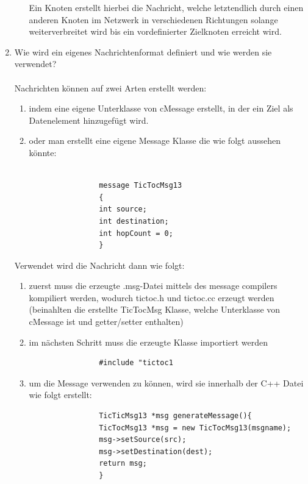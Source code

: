 \documentclass[11pt]{article}
\begin{document}
\begin{enumerate}[\thesubsection .1]
\begin{enumerate}
            Ein Knoten erstellt hierbei die Nachricht, welche letztendlich durch einen
            anderen Knoten im Netzwerk in verschiedenen Richtungen solange weiterverbreitet
            wird bis ein vordefinierter Zielknoten erreicht wird.
        \end{enumerate}

        \item Wie wird ein eigenes Nachrichtenformat definiert und wie werden sie verwendet?\\\\
        Nachrichten können auf zwei Arten erstellt werden:\\
        \begin{enumerate}
            \item{ indem eine eigene Unterklasse von cMessage erstellt, in der ein
            Ziel als Datenelement hinzugefügt wird.\\}
            \item{oder man erstellt eine eigene Message Klasse die wie folgt aussehen könnte:\\\\}
            \begin{lstlisting}
                message TicTocMsg13
                {
                int source;
                int destination;
                int hopCount = 0;
                }
            \end{lstlisting}
        \end{enumerate}

        Verwendet wird die Nachricht dann wie folgt:\\
        \begin{enumerate}
            \item{zuerst muss die erzeugte .msg-Datei mittels
            des message compilers kompiliert werden, wodurch tictoc.h
            und tictoc.cc erzeugt werden (beinahlten die erstellte TicTocMsg Klasse,
            welche Unterklasse von cMessage ist und getter/setter enthalten)\\}

            \item{im nächsten Schritt muss die erzeugte Klasse importiert werden}
            \begin{lstlisting}
                #include "tictoc1
            \end{lstlisting}


            \item{um die Message verwenden zu können, wird sie innerhalb der C++ Datei
            wie folgt erstellt:\\}
            \begin{lstlisting}
                TicTicMsg13 *msg generateMessage(){
                TicTocMsg13 *msg = new TicTocMsg13(msgname);
                msg->setSource(src);
                msg->setDestination(dest);
                return msg;
                }
            \end{lstlisting}


\end{enumerate}
\end{enumerate}
\end{document}
